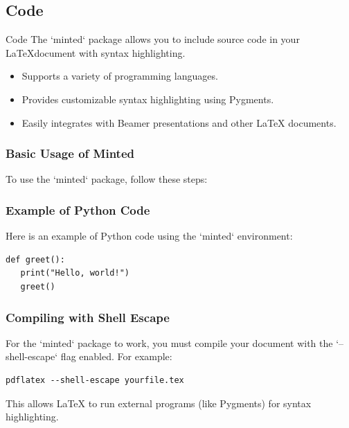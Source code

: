 \documentclass{beamer}
\begin{document}
\subsection{Code}

\begin{frame}{Code}
The `minted` package allows you to include source code in your \LaTeX document with syntax highlighting.
\begin{itemize}
	\item Supports a variety of programming languages.
	\item Provides customizable syntax highlighting using Pygments.
	\item Easily integrates with Beamer presentations and other LaTeX documents.
\end{itemize}
\end{frame}

\begin{frame}[fragile]
\frametitle{Basic Usage of Minted}
To use the `minted` package, follow these steps:
\end{frame}

\begin{frame}[fragile]
\frametitle{Example of Python Code}
Here is an example of Python code using the `minted` environment:
\begin{verbatim}
def greet():
   print("Hello, world!")
   greet()
\end{verbatim}
\end{frame}

\begin{frame}[fragile]
\frametitle{Compiling with Shell Escape}
For the `minted` package to work, you must compile your document with the `--shell-escape` flag enabled. For example:
\begin{verbatim}
pdflatex --shell-escape yourfile.tex
\end{verbatim}
This allows LaTeX to run external programs (like Pygments) for syntax highlighting.
\end{frame}
\end{document}
